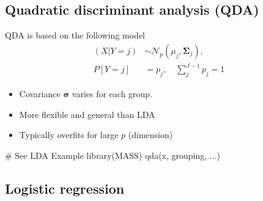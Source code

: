 \subsection{Quadratic discriminant analysis (QDA)}
\begin{theory}
 QDA is based on the following model
 \begin{align*}
  (X|Y=j) & \sim \mathcal{N}_p(\mu_j, \boldsymbol{\Sigma}_j),\\
  P[Y=j]  & = p_j, \quad \sum_j^{J-1}p_j=1
 \end{align*}
 \begin{itemize}
  \item Covariance $\boldsymbol{\sigma}$ varies for each group.
  \item[\leftthumbsup] More flexible and general than LDA
  \item[\leftthumbsdown] Typically overfits for large $p$ (dimension)
 \end{itemize} 
\end{theory}
\begin{code}
 # See LDA Example
 library(MASS)
 qda(x, grouping, ...)
\end{code}

\subsection{Logistic regression}